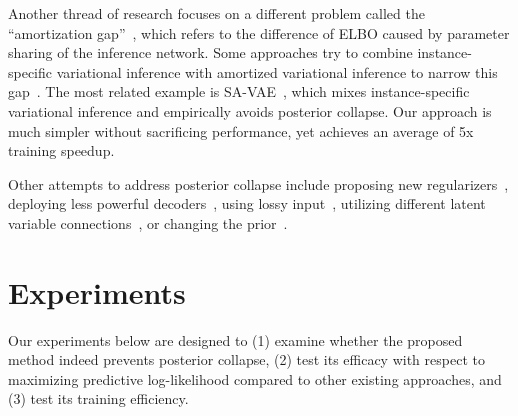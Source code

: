 \documentclass{article} \usepackage{iclr2019_conference,times}
\begin{document}
Another thread of research focuses on a different problem called the ``amortization gap''~\citep{cremer2018inference}, which refers to the difference of ELBO caused by parameter sharing of the inference network. Some approaches try to combine instance-specific variational inference with amortized variational inference to narrow this gap~\citep{hjelm2016iterative,krishnan2018challenges,kim2018semi,marino2018iterative}. The most related example is SA-VAE~\citep{kim2018semi}, which mixes instance-specific variational inference and empirically avoids posterior collapse. Our approach is much simpler without sacrificing performance, yet achieves an average of 5x training speedup. 

Other attempts to address posterior collapse include proposing new regularizers~\citep{zhao2017infovae,goyal2017z,tolstikhin2017wasserstein,phuong2018the}, deploying less powerful decoders~\citep{yang2017improved,semeniuta2017hybrid}, using lossy input~\citep{chen2016variational}, utilizing different latent variable connections~\citep{dieng2016topicrnn,dieng2018avoiding, park2018hierarchical}, or changing the prior~\citep{tomczak2017vae,xu2018spherical}. 

\section{Experiments}
\label{sec:expresults}
Our experiments below are designed to (1) examine whether the proposed method indeed prevents posterior collapse, (2) test its efficacy with respect to maximizing predictive log-likelihood compared to other existing approaches, and (3) test its training efficiency.
\end{document}
